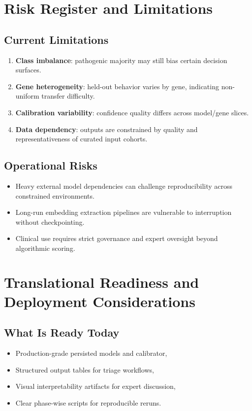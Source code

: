 \documentclass[11pt,a4paper]{article}
\begin{document}
\section{Risk Register and Limitations}
\subsection{Current Limitations}
\begin{enumerate}[leftmargin=1.2cm]
    \item \textbf{Class imbalance}: pathogenic majority may still bias certain decision surfaces.
    \item \textbf{Gene heterogeneity}: held-out behavior varies by gene, indicating non-uniform transfer difficulty.
    \item \textbf{Calibration variability}: confidence quality differs across model/gene slices.
    \item \textbf{Data dependency}: outputs are constrained by quality and representativeness of curated input cohorts.
\end{enumerate}

\subsection{Operational Risks}
\begin{itemize}[leftmargin=1.2cm]
    \item Heavy external model dependencies can challenge reproducibility across constrained environments.
    \item Long-run embedding extraction pipelines are vulnerable to interruption without checkpointing.
    \item Clinical use requires strict governance and expert oversight beyond algorithmic scoring.
\end{itemize}

\section{Translational Readiness and Deployment Considerations}
\subsection{What Is Ready Today}
\begin{itemize}[leftmargin=1.2cm]
    \item Production-grade persisted models and calibrator,
    \item Structured output tables for triage workflows,
    \item Visual interpretability artifacts for expert discussion,
    \item Clear phase-wise scripts for reproducible reruns.
\end{itemize}
\end{document}

